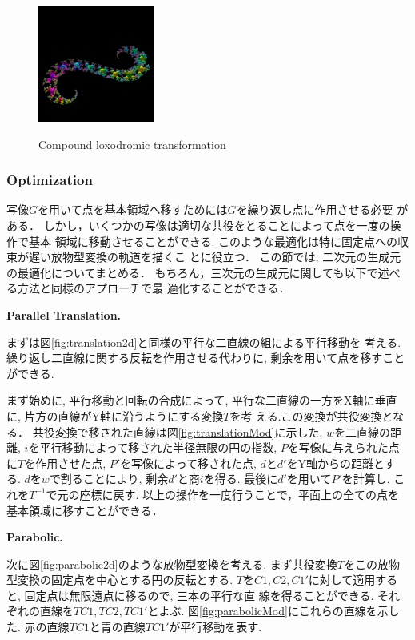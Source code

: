 \begin{figure}[h!tbp]
\begin{minipage}{0.49\hsize}
\begin{minipage}{0.24\hsize}
  \center
  \includegraphics[width=1.5in, height=1.5in, keepaspectratio]{../img/klein/3diis/compLoxoOrb.pdf}
   \label{fig:compLoxoOrb}
 \end{minipage}
 \hspace*{\fill}
  \caption{Compound loxodromic transformation}
 \label{fig:compLoxo}
 \end{minipage}
\end{figure}

\subsubsection{Optimization}

写像$G$を用いて点を基本領域へ移すためには$G$を繰り返し点に作用させる必要
がある．
しかし，いくつかの写像は適切な共役をとることによって点を一度の操作で基本
領域に移動させることができる.
このような最適化は特に固定点への収束が遅い放物型変換の軌道を描くこ
とに役立つ．
この節では, 二次元の生成元の最適化についてまとめる．
もちろん，三次元の生成元に関しても以下で述べる方法と同様のアプローチで最
適化することができる．

\noindent\textbf{Parallel Translation.}

まずは図\ref{fig:translation2d}と同様の平行な二直線の組による平行移動を
考える.
繰り返し二直線に関する反転を作用させる代わりに, 剰余を用いて点を移すこと
ができる.

まず始めに, 平行移動と回転の合成によって,
平行な二直線の一方をX軸に垂直に, 片方の直線がY軸に沿うようにする変換$T$を考
える.この変換が共役変換となる．
共役変換で移された直線は図\ref{fig:translationMod}に示した.
$w$を二直線の距離, $i$を平行移動によって移された半径無限の円の指数,
$P$を写像に与えられた点に$T$を作用させた点,
$P'$を写像によって移された点, $d$と$d'$をY軸からの距離とする.
$d$を$w$で割ることにより, 剰余$d'$と商$i$を得る.
最後に$d'$を用いて$P'$を計算し, これを$T^{-1}$で元の座標に戻す.
以上の操作を一度行うことで，平面上の全ての点を基本領域に移すことができる．

\noindent\textbf{Parabolic.}

次に図\ref{fig:parabolic2d}のような放物型変換を考える.
まず共役変換$T$をこの放物型変換の固定点を中心とする円の反転とする.
$T$を$C1,C2,C1'$に対して適用すると, 固定点は無限遠点に移るので, 三本の平行な直
線を得ることができる.
それぞれの直線を$TC1, TC2, TC1'$とよぶ.
図\ref{fig:parabolicMod}にこれらの直線を示した.
赤の直線$TC1$と青の直線$TC1'$が平行移動を表す.

